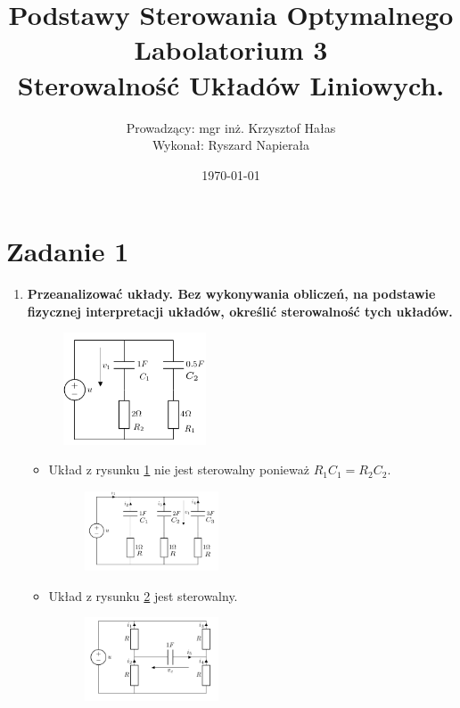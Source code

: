 \documentclass[12pt, letterpaper]{article}
\title{
    \huge Podstawy Sterowania Optymalnego\\Labolatorium 3\\
    \large Sterowalność Układów Liniowych.
}
\author{Prowadzący: mgr inż. Krzysztof Hałas\\
        Wykonał: Ryszard Napierała}
\date{\today}
\begin{document}
    \maketitle

    \section*{Zadanie 1}
    \begin{enumerate}
        \item\textbf{Przeanalizować układy. Bez wykonywania obliczeń,
            na podstawie fizycznej interpretacji układów, określić sterowalność tych układów.}
            \begin{figure}[H]
                \centering
                \includegraphics[width=0.4\textwidth]{lab3/rys1}
                \caption{}
                \label{fig:1}
            \end{figure}
            \begin{itemize}
                \item Układ z rysunku \ref{fig:1} nie jest sterowalny ponieważ $R_1C_1=R_2C_2$.
                \begin{figure}[H]
                    \centering
                    \includegraphics[width=0.4\textwidth]{lab3/rys2}
                    \caption{}
                    \label{fig:2}
                \end{figure}
                \item Układ z rysunku \ref{fig:2} jest sterowalny.
                \begin{figure}[H]
                    \centering
                    \includegraphics[width=0.4\textwidth]{lab3/rys3}

\end{figure}
\end{itemize}
\end{enumerate}
\end{document}
